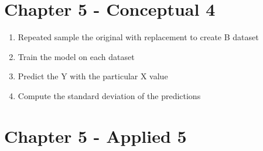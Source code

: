 \documentclass{article}
\begin{document}
\section{Chapter 5 - Conceptual 4}

\begin{enumerate}[label=(\alph*)]
\item Repeated sample the original with replacement to create B dataset
\item Train the model on each dataset
\item Predict the Y with the particular X value
\item Compute the standard deviation of the predictions
\end{enumerate}

\section{Chapter 5 - Applied 5}
\end{document}
